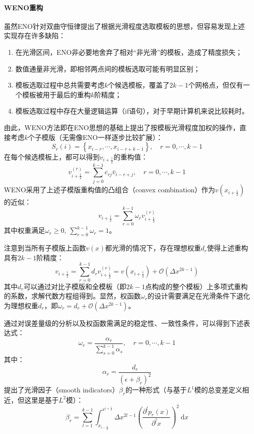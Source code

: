 \documentclass[11pt]{article}
\begin{document}
\paragraph{WENO重构} 虽然ENO针对双曲守恒律提出了根据光滑程度选取模板的思想，但容易发现上述实现存在许多缺陷：
\begin{enumerate}
	\item 在光滑区间，ENO非必要地舍弃了相对“非光滑”的模板，造成了精度损失；
	\item 数值通量非光滑，即相邻两点间的模板选取可能有明显区别；
	\item 模板选取过程中总共需要考虑$k$个候选模板，覆盖了$2k-1$个网格点，但仅有一个模板被用于最后的重构$k$阶精度；
	\item 模板选取过程中存在大量逻辑运算（if语句），对于早期计算机来说比较耗时。
\end{enumerate}
由此，WENO方法即在ENO思想的基础上提出了按模板光滑程度加权的操作，直接考虑$k$个子模版（无需像ENO一样逐步比较扩展）：
\begin{equation}
	S_r(i)=\left\{x_{i-r},\cdots,x_{i-r+k-1}\right\},\quad r=0,\cdots,k-1
\end{equation}
在每个候选模板上，都可以得到$v_{i+\frac{1}{2}}$的重构值：
\begin{equation}
	v_{i+\frac{1}{2}}^{(r)}=\sum_{j=0}^{k-1}c_{rj}\bar{v}_{i-r+j},\quad r=0,\cdots,k-1
\end{equation}
WENO采用了上述子模版重构值的凸组合（convex combination）作为$v(x_{i+\frac{1}{2}})$的近似：
\begin{equation}
	v_{i+\frac{1}{2}}=\sum_{r=0}^{k-1}\omega_rv_{i+\frac{1}{2}}^{(r)}
\end{equation}
其中权重满足$\omega_r\geq0,\ \sum_{r=0}^{k-1}\omega_r=1$。

注意到当所有子模版上函数$v(x)$都光滑的情况下，存在理想权重$d_r$使得上述重构具有$2k-1$阶精度：
\begin{equation}
	v_{i+\frac{1}{2}}=\sum_{r=0}^{k-1}d_r v_{i+\frac{1}{2}}^{(r)}=v(x_{i+\frac{1}{2}})+\mathcal{O}(\Delta x^{2k-1})
\end{equation}
其中$d_r$可以通过对比子模版和全模板（即$2k-1$点构成的整个模板）上多项式重构的系数，求解代数方程组得到。显然，权函数$\omega_r$的设计需要满足在光滑条件下退化为理想权重$d_r$，即$\omega_r=d_r+\mathcal{O}(\Delta x^{2k-1})$。

通过对误差量级的分析以及权函数需满足的稳定性、一致性条件，可以得到下述表达式：
\begin{equation}
	\omega_r=\frac{\alpha_r}{\sum_{s=0}^{k-1}\alpha_s},\quad r=0,\cdots,k-1
\end{equation}
其中：
\begin{equation}
	\alpha_r=\frac{d_r}{(\epsilon+\beta_r)^2}
\end{equation}
\citet{jiang_efficient_1996}提出了光滑因子（smooth indicators）$\beta_r$的一种形式（与基于$L^1$模的总变差定义相近，但这里是基于$L^2$模）：
\begin{equation}
	\beta_r=\sum_{l=1}^{k-1}\int_{x_{i-\frac{1}{2}}}^{x^{i+\frac{1}{2}}}\Delta x^{2l-1}\left(\frac{\partial^l p_r(x)}{\partial^l x}\right)^2\ \mathrm{d}x
\end{equation}
\end{document}
